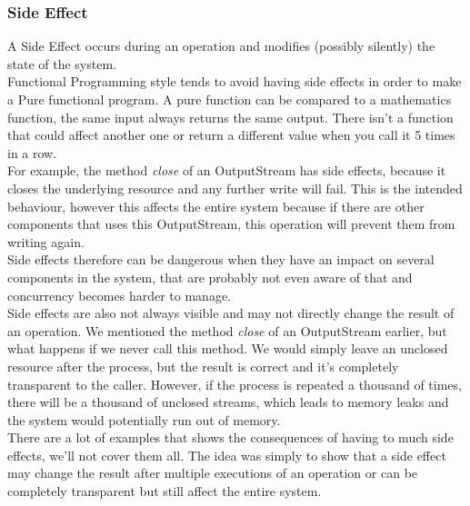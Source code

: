 \subsubsection{Side Effect}
A Side Effect occurs during an operation and modifies (possibly silently)
the state of the system. \\
Functional Programming style tends to avoid having side effects in order
to make a Pure functional program.
A pure function can be compared to a mathematics function, the same
input always returns the same output.
There isn't a function that could affect another one or return a
different value when you call it 5 times in a row. \\
\newline
For example, the method \textit{close} of an OutputStream has side
effects, because it closes the underlying resource and any further
write will fail.
This is the intended behaviour, however this affects the entire system
because if there are other components that uses this OutputStream, this
operation will prevent them from writing again. \\
Side effects therefore can be dangerous when they have an impact on
several components in the system, that are probably not even aware of
that and concurrency becomes harder to manage. \\
\newline
Side effects are also not always visible and may not directly change the
result of an operation.
We mentioned the method \textit{close} of an OutputStream earlier, but
what happens if we never call this method.
We would simply leave an unclosed resource after the process, but the
result is correct and it's completely transparent to the caller.
However, if the process is repeated a thousand of times, there will be
a thousand of unclosed streams, which leads to memory leaks and the
system would potentially run out of memory. \\
\newline
There are a lot of examples that shows the consequences of having
to much side effects, we'll not cover them all.
The idea was simply to show that a side effect may change the result
after multiple executions of an operation or can be completely
transparent but still affect the entire system.

